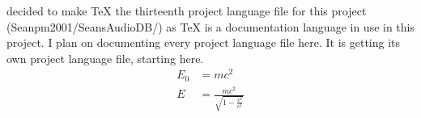 \documentclass{article} %
\title{\ProjectLanguageFileThirteen} %
\begin{document}
  \maketitle
  \I decided to make TeX the thirteenth project language file for this project (Seanpm2001/SeansAudioDB/) as TeX is a documentation language in use in this project. I plan on documenting every project language file here. It is getting its own project language file, starting here.
  \begin{align}
    E_0 &= mc^2 \\
    E &= \frac{mc^2}{\sqrt{1-\frac{v^2}{c^2}}}
  \end{align} 
\end{document}
